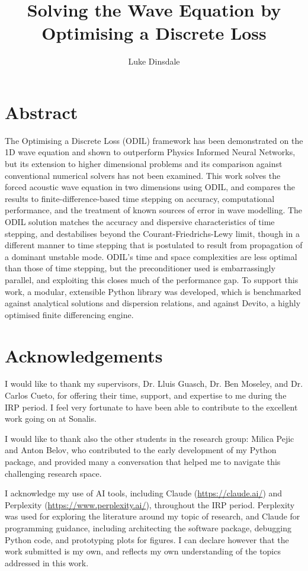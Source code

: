 \documentclass[final-report]{report-template}
\title{Solving the Wave Equation by Optimising a Discrete Loss}
\author{Luke Dinsdale}
\begin{document}

\maketitlepage  %

\section*{Abstract}
\label{sect:abstract}

The Optimising a Discrete Loss (ODIL) framework has been demonstrated on the 1D wave equation and shown to outperform Physics Informed Neural Networks, but its extension to higher dimensional problems and its comparison against conventional numerical solvers has not been examined. This work solves the forced acoustic wave equation in two dimensions using ODIL, and compares the results to finite-difference-based time stepping on accuracy, computational performance, and the treatment of known sources of error in wave modelling. The ODIL solution matches the accuracy and dispersive characteristics of time stepping, and destabilises beyond the Courant-Friedrichs-Lewy limit, though in a different manner to time stepping that is postulated to result from propagation of a dominant unstable mode. ODIL's time and space complexities are less optimal than those of time stepping, but the preconditioner used is embarrassingly parallel, and exploiting this closes much of the performance gap. To support this work, a modular, extensible Python library was developed, which is benchmarked against analytical solutions and dispersion relations, and against Devito, a highly optimised finite differencing engine.

\section*{Acknowledgements}
I would like to thank my supervisors, Dr. Lluis Guasch, Dr. Ben Moseley, and Dr. Carlos Cueto, for offering their time, support, and expertise to me during the IRP period. I feel very fortunate to have been able to contribute to the excellent work going on at Sonalis. 

I would like to thank also the other students in the research group: Milica Pejic and Anton Belov, who contributed to the early development of my Python package, and provided many a conversation that helped me to navigate this challenging research space.

I acknowledge my use of AI tools, including Claude (\url{https://claude.ai/}) and Perplexity (\url{https://www.perplexity.ai/}), throughout the IRP period. Perplexity was used for exploring the literature around my topic of research, and Claude for programming guidance, including architecting the software package, debugging Python code, and prototyping plots for figures. I can declare however that the work submitted is my own, and reflects my own understanding of the topics addressed in this work. 
\end{document}

